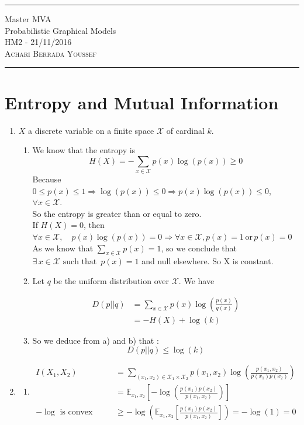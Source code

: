 \documentclass[a4paper,10pt]{article}
\begin{document}
\begin{center}
\rule{\textwidth}{3pt}
Master MVA \\
Probabilistic Graphical Models \\
HM2 - 21/11/2016 \\
\textsc{ Achari Berrada Youssef} \\
\rule{\textwidth}{.3pt}
\end{center}

\section{Entropy and Mutual Information}
\begin{enumerate}
\item $X$ a discrete variable on a finite space $\mathcal{X}$ of cardinal $k$. 
\begin{enumerate}
\item We know that the entropy is 
\[ 
H(X) = - \sum_{x \in \mathcal{X}} p(x) \log(p(x))  \geq 0
\]
Because $0 \leq p(x) \leq 1 \Rightarrow \log(p(x)) \leq 0 \Rightarrow p(x) \log(p(x)) \leq 0 $, $\forall x \in \mathcal{X} $. \\   
So the entropy is greater than or equal to zero. \\ 
If $H(X) = 0$, then $\forall x \in \mathcal{X} , \quad p(x) \log(p(x)) = 0 \Rightarrow \forall x \in \mathcal{X} ,  p(x) = 1 \, \text{or} \, p(x) = 0 $ \\
As we know that $\sum_{x \in \mathcal{X}} p(x)   = 1 $, so we conclude that $\exists \, x \in \mathcal{X} \text{ such that } \, p(x) =1$ and null elsewhere. So X is constant. 

\item Let $q$ be the uniform distribution over $\mathcal{X}$. 
We have 

\begin{align*}
D(p||q)  & = \sum_{x \in \mathcal{X} } p(x) \log\left( \frac{p(x) }{q(x)} \right)  \\
		& = - H(X) + \log(k) 
\end{align*}

\item So we deduce from a) and b) that : 
\[ D(p||q) \leq \log(k) \]
\end{enumerate}
\item 
\begin{enumerate}
\item 
\begin{align*}
I(X_1,X_2)  & = \sum_{(x_1,x_2)\in \mathcal{X}_1 \times \mathcal{X}_2} p(x_1,x_2) \log\left( \frac{p(x_1,x_2)}{p(x_1) p(x_2)}\right) \\
			& = \mathbb{E}_{x_1,x_2} \left[  - \log\left( \frac{p(x_1) p(x_2)}{p(x_1,x_2)}\right) \right]  \\
-\log \text{ is convex} 		\qquad	& \geq   - \log\left(\mathbb{E}_{x_1,x_2} \left[  \frac{p(x_1) p(x_2)}{p(x_1,x_2)} \right]  \right) = -\log (1) = 0
\end{align*}


\end{enumerate}
\end{enumerate}
\end{document}
